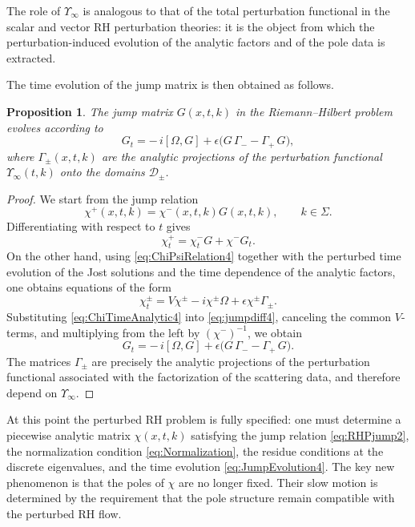 \documentclass[11pt]{amsart}
\newtheorem{proposition}{Proposition}[section]
\theoremstyle{definition}
\numberwithin{equation}{section}
\begin{document}
The role of $\Upsilon_\infty$ is analogous to that of the total perturbation functional in the scalar and vector RH perturbation theories: it is the object from which the perturbation-induced evolution of the analytic factors and of the pole data is extracted.

The time evolution of the jump matrix is then obtained as follows.

\begin{proposition}
The jump matrix $G(x,t,k)$ in the Riemann--Hilbert problem evolves according to
\begin{equation}
G_t = -\,i[\Omega,G] + \epsilon\bigl(G\,\Gamma_- - \Gamma_+\,G\bigr),
\label{eq:JumpEvolution4}
\end{equation}
where $\Gamma_\pm(x,t,k)$ are the analytic projections of the perturbation functional $\Upsilon_\infty(t,k)$ onto the domains $\mathcal D_\pm$.
\end{proposition}

\begin{proof}
We start from the jump relation
\[
\chi^+(x,t,k)=\chi^-(x,t,k)G(x,t,k), \qquad k\in\Sigma.
\]
Differentiating with respect to $t$ gives
\begin{equation}
\chi_t^+ = \chi_t^- G + \chi^- G_t.
\label{eq:jumpdiff4}
\end{equation}
On the other hand, using \eqref{eq:ChiPsiRelation4} together with the perturbed time evolution of the Jost solutions and the time dependence of the analytic factors, one obtains equations of the form
\begin{equation}
\chi_t^\pm = V\chi^\pm - i\chi^\pm\Omega + \epsilon \chi^\pm \Gamma_\pm.
\label{eq:ChiTimeAnalytic4}
\end{equation}
Substituting \eqref{eq:ChiTimeAnalytic4} into \eqref{eq:jumpdiff4}, canceling the common $V$-terms, and multiplying from the left by $(\chi^-)^{-1}$, we obtain
\[
G_t = -\,i[\Omega,G] + \epsilon\bigl(G\,\Gamma_- - \Gamma_+\,G\bigr).
\]
The matrices $\Gamma_\pm$ are precisely the analytic projections of the perturbation functional associated with the factorization of the scattering data, and therefore depend on $\Upsilon_\infty$.
\end{proof}

At this point the perturbed RH problem is fully specified: one must determine a piecewise analytic matrix $\chi(x,t,k)$ satisfying the jump relation \eqref{eq:RHPjump2}, the normalization condition \eqref{eq:Normalization}, the residue conditions at the discrete eigenvalues, and the time evolution \eqref{eq:JumpEvolution4}. The key new phenomenon is that the poles of $\chi$ are no longer fixed. Their slow motion is determined by the requirement that the pole structure remain compatible with the perturbed RH flow.
\end{document}
